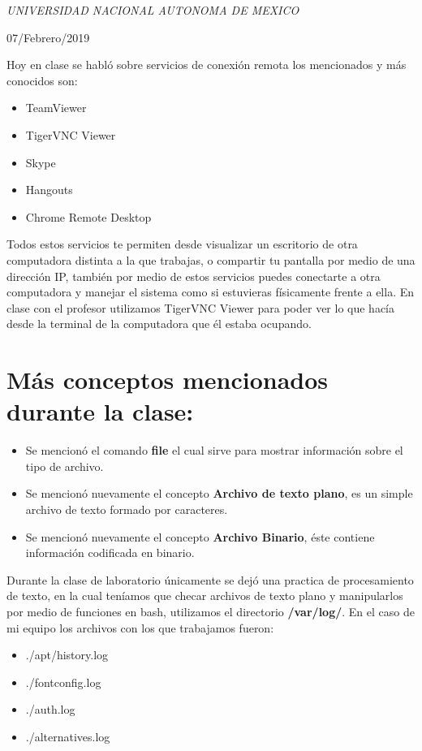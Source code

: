 \documentclass[a4paper, 11pt, oneside]{article}
\begin{document}
\begin{titlepage}
	\textit{UNIVERSIDAD NACIONAL AUTONOMA DE MEXICO} 
	
	\vfill
	
	
	
	
	\vspace{0.3\baselineskip} 
	
	07/Febrero/2019 
	
	 

\end{titlepage}

Hoy en clase se habló sobre servicios de conexión remota los mencionados y más conocidos son:
\begin{itemize}
 \item TeamViewer
 \item TigerVNC Viewer
 \item Skype
 \item Hangouts
 \item Chrome Remote Desktop
\end{itemize}

Todos estos servicios te permiten desde visualizar un escritorio de otra computadora distinta a la que trabajas, o compartir tu pantalla por medio de una dirección IP, también por medio de estos servicios puedes conectarte a otra computadora y manejar el sistema como si estuvieras físicamente frente a ella. En clase con el profesor utilizamos TigerVNC Viewer para poder ver lo que hacía desde la terminal de la computadora que él estaba ocupando.

\section*{Más conceptos mencionados durante la clase:}
\begin{itemize}
 \item Se mencionó el comando \textbf{file} el cual sirve para mostrar información sobre el tipo de archivo.
 \item Se mencionó nuevamente el concepto \textbf{Archivo de texto plano}, es un simple archivo de texto formado por caracteres.
 \item Se mencionó nuevamente el concepto \textbf{Archivo Binario}, éste contiene información codificada en binario.
\end{itemize}

Durante la clase de laboratorio únicamente se dejó una practica de procesamiento de texto, en la cual teníamos que checar archivos de texto plano y manipularlos por medio de funciones en bash, utilizamos el directorio \textbf{/var/log/}. En el caso de mi equipo los archivos con los que trabajamos fueron:

\begin{itemize}
 \item ./apt/history.log
 \item ./fontconfig.log
 \item ./auth.log
 \item ./alternatives.log
\end{itemize}
\end{document}

